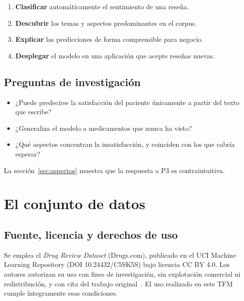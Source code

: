 \documentclass[11pt,a4paper]{article}
\begin{document}
\begin{enumerate}[nosep,leftmargin=*]
  \item \textbf{Clasificar} automáticamente el sentimiento de una reseña.
  \item \textbf{Descubrir} los temas y aspectos predominantes en el corpus.
  \item \textbf{Explicar} las predicciones de forma comprensible para negocio.
  \item \textbf{Desplegar} el modelo en una aplicación que acepte reseñas nuevas.
\end{enumerate}

\subsection{Preguntas de investigación}

\begin{itemize}[nosep,leftmargin=*]
  \item[\textbf{P1}] ¿Puede predecirse la satisfacción del paciente únicamente
        a partir del texto que escribe?
  \item[\textbf{P2}] ¿Generaliza el modelo a medicamentos que nunca ha visto?
  \item[\textbf{P3}] ¿Qué aspectos concentran la insatisfacción, y coinciden
        con los que cabría esperar?
\end{itemize}

La sección~\ref{sec:aspectos} muestra que la respuesta a P3 es contraintuitiva.

\section{El conjunto de datos}

\subsection{Fuente, licencia y derechos de uso}

Se emplea el \textit{Drug Review Dataset} (Drugs.com), publicado en el UCI
Machine Learning Repository (DOI 10.24432/C5SK5S) bajo licencia CC BY 4.0. Los
autores autorizan su uso con fines de investigación, sin explotación comercial
ni redistribución, y con cita del trabajo original~\cite{graesser2018}.
El uso realizado en este TFM cumple íntegramente esas condiciones.
\end{document}
